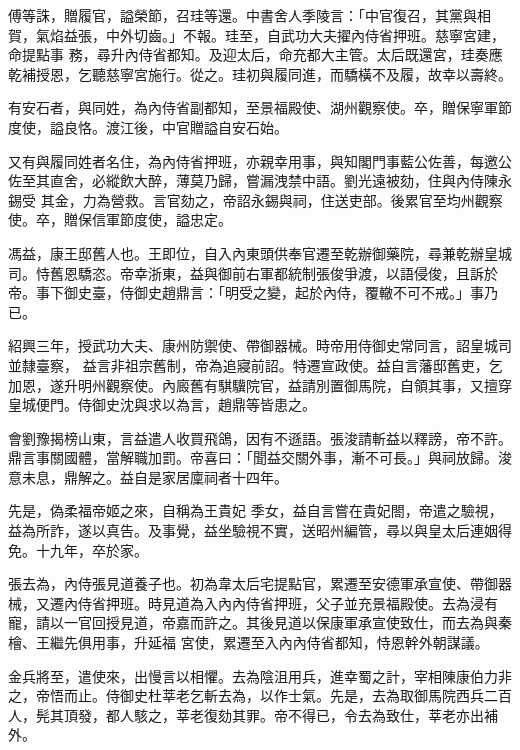 \begin{pinyinscope}
 傅等誅，贈履官，謚榮節，召珪等還。中書舍人季陵言：「中官復召，其黨與相賀，氣焰益張，中外切齒。」不報。珪至，自武功大夫擢內侍省押班。慈寧宮建，命提點事
 務，尋升內侍省都知。及迎太后，命充都大主管。太后既還宮，珪奏應乾補授恩，乞聽慈寧宮施行。從之。珪初與履同進，而驕橫不及履，故幸以壽終。



 有安石者，與同姓，為內侍省副都知，至景福殿使、湖州觀察使。卒，贈保寧軍節度使，謚良恪。渡江後，中官贈謚自安石始。



 又有與履同姓者名住，為內侍省押班，亦親幸用事，與知閣門事藍公佐善，每邀公佐至其直舍，必縱飲大醉，薄莫乃歸，嘗漏洩禁中語。劉光遠被劾，住與內侍陳永錫受
 其金，力為營救。言官劾之，帝詔永錫與祠，住送吏部。後累官至均州觀察使。卒，贈保信軍節度使，謚忠定。



 馮益，康王邸舊人也。王即位，自入內東頭供奉官遷至乾辦御藥院，尋兼乾辦皇城司。恃舊恩驕恣。帝幸浙東，益與御前右軍都統制張俊爭渡，以語侵俊，且訴於帝。事下御史臺，侍御史趙鼎言：「明受之變，起於內侍，覆轍不可不戒。」事乃已。



 紹興三年，授武功大夫、康州防禦使、帶御器械。時帝用侍御史常同言，詔皇城司並隸臺察，
 益言非祖宗舊制，帝為追寢前詔。特遷宣政使。益自言藩邸舊吏，乞加恩，遂升明州觀察使。內廄舊有騏驥院官，益請別置御馬院，自領其事，又擅穿皇城便門。侍御史沈與求以為言，趙鼎等皆患之。



 會劉豫揭榜山東，言益遣人收買飛鴿，因有不遜語。張浚請斬益以釋謗，帝不許。鼎言事關國體，當解職加罰。帝喜曰：「聞益交關外事，漸不可長。」與祠放歸。浚意未息，鼎解之。益自是家居廩祠者十四年。



 先是，偽柔福帝姬之來，自稱為王貴妃
 季女，益自言嘗在貴妃閤，帝遣之驗視，益為所詐，遂以真告。及事覺，益坐驗視不實，送昭州編管，尋以與皇太后連姻得免。十九年，卒於家。



 張去為，內侍張見道養子也。初為韋太后宅提點官，累遷至安德軍承宣使、帶御器械，又遷內侍省押班。時見道為入內內侍省押班，父子並充景福殿使。去為浸有寵，請以一官回授見道，帝嘉而許之。其後見道以保康軍承宣使致仕，而去為與秦檜、王繼先俱用事，升延福
 宮使，累遷至入內內侍省都知，恃恩幹外朝謀議。



 金兵將至，遣使來，出慢言以相懼。去為陰沮用兵，進幸蜀之計，宰相陳康伯力非之，帝悟而止。侍御史杜莘老乞斬去為，以作士氣。先是，去為取御馬院西兵二百人，髡其頂發，都人駭之，莘老復劾其罪。帝不得已，令去為致仕，莘老亦出補外。




\end{pinyinscope}
